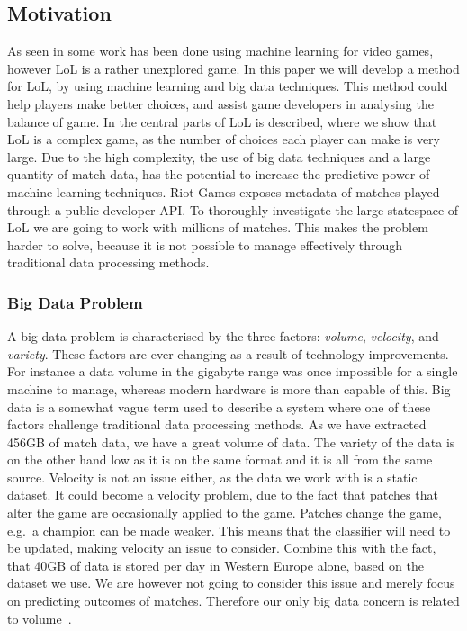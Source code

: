 \subsection{Motivation}\label{sec:motivation}
As seen in  some work has been done using machine learning for video games, however LoL is a rather unexplored game. 
In this paper we will develop a method for LoL, by using machine learning and big data techniques. This method could help players make better choices, and assist game developers in analysing the balance of game. In  the central parts of LoL is described, where we show that LoL is a complex game, as the number of choices each player can make is very large. Due to the high complexity, the use of big data techniques and a large quantity of match data, has the potential to increase the predictive power of machine learning techniques. Riot Games exposes metadata of matches played through a public developer API. To thoroughly investigate the large statespace of LoL we are going to work with millions of matches. This makes the problem harder to solve, because it is not possible to manage effectively through traditional data processing methods.

\subsubsection{Big Data Problem}\label{sec:big_data_problem}
A big data problem is characterised by the three factors: \emph{volume}, \emph{velocity}, and \emph{variety}. These factors are ever changing as a result of technology improvements. For instance a data volume in the gigabyte range was once impossible for a single machine to manage, whereas modern hardware is more than capable of this. Big data is a somewhat vague term used to describe a system where one of these factors challenge traditional data processing methods. As we have extracted 456GB of match data, we have a great volume of data. The variety of the data is on the other hand low as it is on the same format and it is all from the same source. Velocity is not an issue either, as the data we work with is a static dataset. It could become a velocity problem, due to the fact that patches that alter the game are occasionally applied to the game. Patches change the game, e.g.\ a champion can be made weaker. This means that the classifier will need to be updated, making velocity an issue to consider. Combine this with the fact, that 40GB of data is stored per day in Western Europe alone, based on the dataset we use. We are however not going to consider this issue and merely focus on predicting outcomes of matches. Therefore our only big data concern is related to volume~\cite{madden2012databases}.

